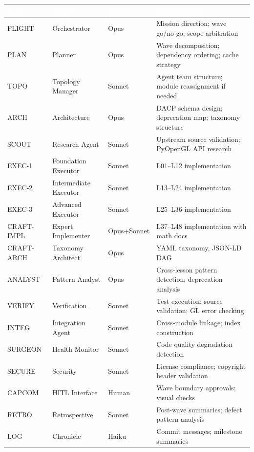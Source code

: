 \documentclass[11pt,letterpaper]{article}
\newcommand{\tableheader}[1]{\textbf{\sffamily\textcolor{white}{#1}}}
\begin{document}
\begin{center}
\begin{tabularx}{\textwidth}{L{2cm}L{3.5cm}L{2cm}X}
\toprule
{}
\tableheader{Role} & \tableheader{Agent} & \tableheader{Model} & \tableheader{Responsibility} \\
\midrule
FLIGHT & Orchestrator & Opus & Mission direction; wave go/no-go; scope arbitration \\
PLAN & Planner & Opus & Wave decomposition; dependency ordering; cache strategy \\
TOPO & Topology Manager & Sonnet & Agent team structure; module reassignment if needed \\
ARCH & Architecture & Opus & DACP schema design; deprecation map; taxonomy structure \\
SCOUT & Research Agent & Sonnet & Upstream source validation; PyOpenGL API research \\
EXEC-1 & Foundation Executor & Sonnet & L01--L12 implementation \\
EXEC-2 & Intermediate Executor & Sonnet & L13--L24 implementation \\
EXEC-3 & Advanced Executor & Sonnet & L25--L36 implementation \\
CRAFT-IMPL & Expert Implementer & Opus+Sonnet & L37--L48 implementation with math docs \\
CRAFT-ARCH & Taxonomy Architect & Opus & YAML taxonomy, JSON-LD DAG \\
ANALYST & Pattern Analyst & Opus & Cross-lesson pattern detection; deprecation analysis \\
VERIFY & Verification & Sonnet & Test execution; source validation; GL error checking \\
INTEG & Integration Agent & Sonnet & Cross-module linkage; index construction \\
SURGEON & Health Monitor & Sonnet & Code quality degradation detection \\
SECURE & Security & Sonnet & License compliance; copyright header validation \\
CAPCOM & HITL Interface & Human & Wave boundary approvals; visual checks \\
RETRO & Retrospective & Sonnet & Post-wave summaries; defect pattern analysis \\
LOG & Chronicle & Haiku & Commit messages; milestone summaries \\
\bottomrule
\end{tabularx}
\end{center}
\end{document}
